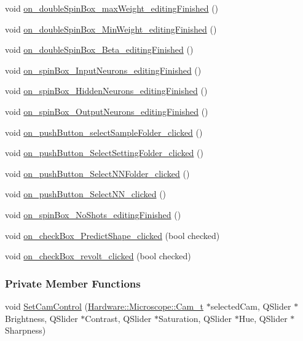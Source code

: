 \begin{DoxyCompactItemize}
\item 
void \hyperlink{class_dialog_settings_a8f26d4080f8c07e11210f927b8a532b2}{on\+\_\+double\+Spin\+Box\+\_\+max\+Weight\+\_\+editing\+Finished} ()
\item 
void \hyperlink{class_dialog_settings_aeef94f22e69a58b76b0c81447d2b8fe0}{on\+\_\+double\+Spin\+Box\+\_\+\+Min\+Weight\+\_\+editing\+Finished} ()
\item 
void \hyperlink{class_dialog_settings_aaac9a0c84d1461fa0753b67466239ee3}{on\+\_\+double\+Spin\+Box\+\_\+\+Beta\+\_\+editing\+Finished} ()
\item 
void \hyperlink{class_dialog_settings_a5c7f94065123d8302ece6261d80c630d}{on\+\_\+spin\+Box\+\_\+\+Input\+Neurons\+\_\+editing\+Finished} ()
\item 
void \hyperlink{class_dialog_settings_a149a62295a8a2f197194879d9a1bd2aa}{on\+\_\+spin\+Box\+\_\+\+Hidden\+Neurons\+\_\+editing\+Finished} ()
\item 
void \hyperlink{class_dialog_settings_a85c6fccd4ff1e7e2f18b2626ca32f57f}{on\+\_\+spin\+Box\+\_\+\+Output\+Neurons\+\_\+editing\+Finished} ()
\item 
void \hyperlink{class_dialog_settings_a8764ca0717402929cf56c717fba7f72d}{on\+\_\+push\+Button\+\_\+select\+Sample\+Folder\+\_\+clicked} ()
\item 
void \hyperlink{class_dialog_settings_a1df15a887dc7ab9d9ab3e1914d9db48f}{on\+\_\+push\+Button\+\_\+\+Select\+Setting\+Folder\+\_\+clicked} ()
\item 
void \hyperlink{class_dialog_settings_af649aa10d4fa099e855836f93ba7e6ba}{on\+\_\+push\+Button\+\_\+\+Select\+N\+N\+Folder\+\_\+clicked} ()
\item 
void \hyperlink{class_dialog_settings_a33d503cc3fe214f248ea18daeceb9100}{on\+\_\+push\+Button\+\_\+\+Select\+N\+N\+\_\+clicked} ()
\item 
void \hyperlink{class_dialog_settings_afc76ede70f3cdde0846623596aeadb22}{on\+\_\+spin\+Box\+\_\+\+No\+Shots\+\_\+editing\+Finished} ()
\item 
void \hyperlink{class_dialog_settings_a2481a5044640ba6f5cbbc325ddde9c0b}{on\+\_\+check\+Box\+\_\+\+Predict\+Shape\+\_\+clicked} (bool checked)
\item 
void \hyperlink{class_dialog_settings_abe2d819e7af01522a7b2f8927dbf4049}{on\+\_\+check\+Box\+\_\+revolt\+\_\+clicked} (bool checked)
\end{DoxyCompactItemize}
\subsubsection*{Private Member Functions}
\begin{DoxyCompactItemize}
\item 
void \hyperlink{class_dialog_settings_a0ee5b471d5007d534e3ed558064d12be}{Set\+Cam\+Control} (\hyperlink{struct_hardware_1_1_microscope_1_1_cam__t}{Hardware\+::\+Microscope\+::\+Cam\+\_\+t} $\ast$selected\+Cam, Q\+Slider $\ast$Brightness, Q\+Slider $\ast$Contrast, Q\+Slider $\ast$Saturation, Q\+Slider $\ast$Hue, Q\+Slider $\ast$Sharpness)
\end{DoxyCompactItemize}
